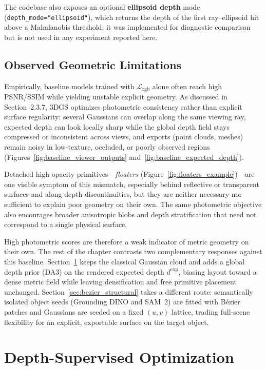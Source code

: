 \documentclass{report}
\begin{document}
The codebase also exposes an optional \textbf{ellipsoid depth} mode (\texttt{depth\_mode="ellipsoid"}), which returns the depth of the first ray--ellipsoid hit above a Mahalanobis threshold; it was implemented for diagnostic comparison but is not used in any experiment reported here.

\subsection{Observed Geometric Limitations}
\label{subsec:baseline_limitations}

Empirically, baseline models trained with $\mathcal{L}_{\mathrm{rgb}}$ alone often reach high PSNR/SSIM while yielding unstable explicit geometry. As discussed in Section~2.3.7, 3DGS optimizes photometric consistency rather than explicit surface regularity: several Gaussians can overlap along the same viewing ray, expected depth can look locally sharp while the global depth field stays compressed or inconsistent across views, and exports (point clouds, meshes) remain noisy in low-texture, occluded, or poorly observed regions (Figures~\ref{fig:baseline_viewer_outputs} and~\ref{fig:baseline_expected_depth}).

Detached high-opacity primitives---\emph{floaters} (Figure~\ref{fig:floaters_example})---are one visible symptom of this mismatch, especially behind reflective or transparent surfaces and along depth discontinuities, but they are neither necessary nor sufficient to explain poor geometry on their own. The same photometric objective also encourages broader anisotropic blobs and depth stratification that need not correspond to a single physical surface.

High photometric scores are therefore a weak indicator of metric geometry on their own. The rest of the chapter contrasts two complementary responses against this baseline. Section~\ref{sec:depth_supervised} keeps the classical Gaussian cloud and adds a global depth prior (DA3) on the rendered expected depth $d^{\mathrm{exp}}$, biasing layout toward a dense metric field while leaving densification and free primitive placement unchanged. Section~\ref{sec:bezier_structural} takes a different route: semantically isolated object seeds (Grounding DINO and SAM~2) are fitted with B\'ezier patches and Gaussians are seeded on a fixed $(u,v)$ lattice, trading full-scene flexibility for an explicit, exportable surface on the target object.

\section{Depth-Supervised Optimization}
\label{sec:depth_supervised}
\end{document}
